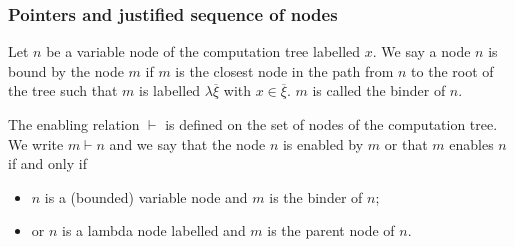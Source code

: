\subsubsection{Pointers and justified sequence of nodes}

\begin{dfn}[Binder]
Let $n$ be a variable node of the computation tree labelled $x$. We
say a node $n$ is bound by the node $m$ if $m$ is the closest node
in the path from $n$ to the root of the tree such that $m$ is
labelled $\lambda \overline{\xi}$ with $x\in \overline{\xi}$. $m$ is
called the binder of $n$.
\end{dfn}

\begin{dfn}[Enabling]
The enabling relation $\vdash$ is defined on the set of nodes of the
computation tree. We write $m \vdash n$ and we say that the node $n$
is enabled by $m$ or that $m$ enables $n$ if and only if
\begin{itemize}
\item $n$ is a (bounded) variable node and $m$ is the binder of $n$;
\item or $n$ is a lambda node labelled and $m$ is the parent node of $n$.
\end{itemize}
\end{dfn}



